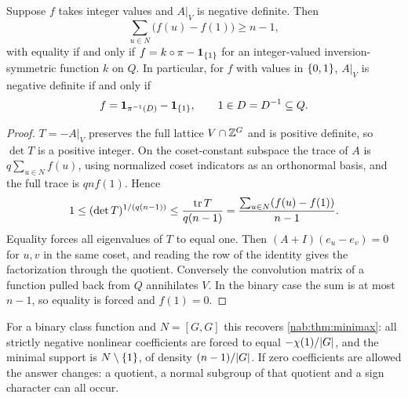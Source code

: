 \begin{proposition}\label{nab:prop:rigidity}
Suppose $f$ takes integer values and $A|_V$ is negative definite. Then
\[
 \sum_{u\in N}\bigl(f(u)-f(1)\bigr)\ge n-1,
\]
with equality if and only if $f=k\circ\pi-\mathbf{1}_{\{1\}}$ for an integer-valued
inversion-symmetric function $k$ on $Q$. In particular, for $f$ with values in $\{0,1\}$,
$A|_V$ is negative definite if and only if
\[
 f=\mathbf{1}_{\pi^{-1}(D)}-\mathbf{1}_{\{1\}},\qquad 1\in D=D^{-1}\subseteq Q .
\]
\end{proposition}
\begin{proof}
$T=-A|_V$ preserves the full lattice $V\cap\mathbb{Z}^G$ and is positive definite, so $\det T$ is a
positive integer. On the coset-constant subspace the trace of $A$ is $q\sum_{u\in N}f(u)$,
using normalized coset indicators as an orthonormal basis, and the full trace is $qnf(1)$.
Hence
\[
 1\le(\det T)^{1/(q(n-1))}\le\frac{\operatorname{tr} T}{q(n-1)}=\frac{\sum_{u\in N}(f(u)-f(1))}{n-1}.
\]
Equality forces all eigenvalues of $T$ to equal one. Then $(A+I)(e_u-e_v)=0$ for $u,v$ in
the same coset, and reading the row of the identity gives the factorization through the
quotient. Conversely the convolution matrix of a function pulled back from $Q$ annihilates
$V$. In the binary case the sum is at most $n-1$, so equality is forced and $f(1)=0$.
\end{proof}

For a binary class function and $N=[G,G]$ this recovers \cref{nab:thm:minimax}: all
strictly negative nonlinear coefficients are forced to equal $-\chi(1)/\lvert G\rvert$, and the
minimal support is $N\setminus\{1\}$, of density $(n-1)/\lvert G\rvert$. If zero coefficients are
allowed the answer changes: a quotient, a normal subgroup of that quotient and a sign
character can all occur.

